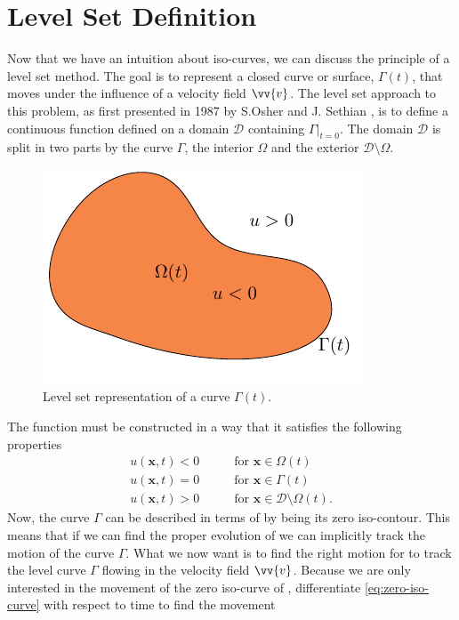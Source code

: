 \section{Level Set Definition}
Now that we have an intuition about iso-curves, we can discuss the principle
of a level set method. The goal is to represent a closed curve or surface, 
$\Gamma(t)$, that moves under the influence of a velocity field $\vv{v}$.
The level set approach to this problem, as first presented in 1987 by 
S.Osher and J. Sethian \cite{MR965860}, is to define a continuous function
\uxt defined on a domain $\mathcal{D}$ containing $\Gamma|_{t=0}$.
The domain $\mathcal{D}$ is split in two parts by the curve $\Gamma$, the interior
$\Omega$ and the exterior $\mathcal{D} \setminus \Omega$. 
\begin{figure}
    \centering
    \includegraphics[width=.5\linewidth]{figures/tikz-figures/optimization-problem.pdf}
    \caption{Level set representation of a curve $\Gamma (t)$.}
    \label{fig:levelset-representation}
\end{figure}
The function \uxt must be constructed in a way that it satisfies the following properties
\begin{align}
    u(\mathbf{x}, t) < 0 \qquad &\text{for } \mathbf{x} \in  \Omega(t) \label{eq:interior}\\
    u(\mathbf{x}, t) = 0 \qquad &\text{for } \mathbf{x} \in  \Gamma(t) \label{eq:zero-iso-curve}\\
    u(\mathbf{x}, t) > 0 \qquad &\text{for } \mathbf{x} \in  \mathcal{D} \setminus \Omega(t) \label{eq:exterior}.
\end{align}
Now, the curve $\Gamma$ can be described in terms of \uxt by being its 
zero iso-contour. This means that if we can find the proper evolution of 
\uxt we can implicitly track the motion of the curve $\Gamma$.
What we now want is to find the right motion for \uxt to
track the level curve $\Gamma$ flowing in the velocity field $\vv{v}$. Because
we are only interested in the movement of the zero iso-curve of \uxt,
differentiate \eqref{eq:zero-iso-curve} with respect to time to find the movement

